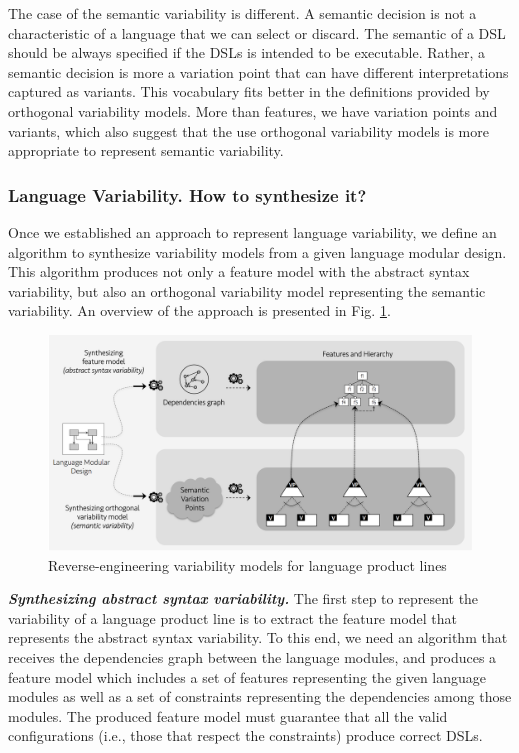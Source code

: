 The case of the semantic variability is different. A semantic decision is not a characteristic of a language that we can select or discard. The semantic of a DSL should be always specified if the DSLs is intended to be executable. Rather, a semantic decision is more a variation point that can have different interpretations captured as variants. This vocabulary fits better in the definitions provided by orthogonal variability models. More than features, we have variation points and variants, which also suggest that the use orthogonal variability models is more appropriate to represent semantic variability.

\subsubsection{Language Variability. \textbf{How to synthesize it?}}

Once we established an approach to represent language variability, we define an algorithm to synthesize variability models from a given language modular design. This algorithm produces not only a feature model with the abstract syntax variability, but also an orthogonal variability model representing the semantic variability. An overview of the approach is presented in Fig. \ref{fig:everse-engineering-vm}. 

\begin{figure}
\centering
\includegraphics[width=1\linewidth]{images/reverse-engineering-vm.png}
\caption{Reverse-engineering variability models for language product lines}
\label{fig:everse-engineering-vm}
\end{figure}

\vspace{2mm}
\textit{\textbf{Synthesizing abstract syntax variability.}} The first step to represent the variability of a language product line is to extract the feature model that represents the abstract syntax variability. To this end, we need an algorithm that receives the dependencies graph between the language modules, and produces a feature model which includes a set of features representing the given language modules as well as a set of constraints representing the dependencies among those modules. The produced feature model must guarantee that all the valid configurations (i.e., those that respect the constraints) produce correct DSLs.

